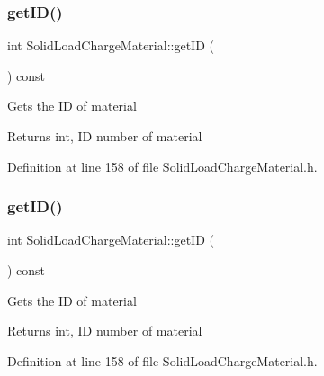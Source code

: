 \subsubsection{\texorpdfstring{get\+I\+D()}{getID()}\hspace{0.1cm}{\footnotesize\ttfamily [2/3]}}
{\footnotesize\ttfamily int Solid\+Load\+Charge\+Material\+::get\+ID (\begin{DoxyParamCaption}{ }\end{DoxyParamCaption}) const\hspace{0.3cm}{\ttfamily [inline]}}

Gets the ID of material \begin{DoxyReturn}{Returns}
int, ID number of material 
\end{DoxyReturn}


Definition at line 158 of file Solid\+Load\+Charge\+Material.\+h.

\mbox{\label{class_solid_load_charge_material_a99a4a5d50309c37bf95cb2b446bcba04}} 
\subsubsection{\texorpdfstring{get\+I\+D()}{getID()}\hspace{0.1cm}{\footnotesize\ttfamily [3/3]}}
{\footnotesize\ttfamily int Solid\+Load\+Charge\+Material\+::get\+ID (\begin{DoxyParamCaption}{ }\end{DoxyParamCaption}) const\hspace{0.3cm}{\ttfamily [inline]}}

Gets the ID of material \begin{DoxyReturn}{Returns}
int, ID number of material 
\end{DoxyReturn}


Definition at line 158 of file Solid\+Load\+Charge\+Material.\+h.

\mbox{\label{class_solid_load_charge_material_ae5d7f198fb1d4a3adb0cfc911a13ea06}} 
